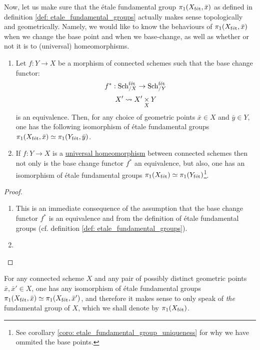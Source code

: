         Now, let us make sure that the \'etale fundamental group $\pi_1(X_{\mathrm{f\acute{e}t}}, \bar{x})$ as defined in definition \ref{def: etale_fundamental_groups} actually makes sense topologically and geometrically. Namely, we would like to know the behaviours of $\pi_1(X_{\mathrm{f\acute{e}t}}, \bar{x})$ when we change the base point and when we base-change, as well as whether or not it is  to (universal) homeomorphisms.
        \begin{proposition} \label{prop: the_etale_fundamental_group_as_a_topological_invariance}
            \noindent
            \begin{enumerate}
                \item Let $f: Y \to X$ be a morphism of connected schemes such that the base change functor:
                    $$f^*: \mathrm{Sch}_{/X}^{\mathrm{f\acute{e}t}} \to \mathrm{Sch}_{/Y}^{\mathrm{f\acute{e}t}}$$
                    $$X' \mapsto X' \x_X Y$$
                is an equivalence. Then, for any choice of geometric points $\bar{x} \in X$ and $\bar{y} \in Y$, one has the following isomorphism of \'etale fundamental groups $\pi_1(X_{\mathrm{f\acute{e}t}}, \bar{x}) \simeq \pi_1(Y_{\mathrm{f\acute{e}t}}, \bar{y})$.
                \item If $f: Y \to X$ is a \href{https://stacks.math.columbia.edu/tag/04DC}{\underline{universal homeomorphism}} between connected schemes then not only is the base change functor $f^*$ an equivalence, but also, one has an isomorphism of \'etale fundamental groups $\pi_1(X_{\mathrm{f\acute{e}t}}) \simeq \pi_1(Y_{\mathrm{f\acute{e}t}})$\footnote{See corollary \ref{coro: etale_fundamental_group_uniqueness} for why we have ommited the base points.}. 
            \end{enumerate}
        \end{proposition}
            \begin{proof}
                \noindent
                \begin{enumerate}
                    \item This is an immediate consequence of the assumption that the base change functor $f^*$ is an equivalence and from the definition of \'etale fundamental groups (cf. definition \ref{def: etale_fundamental_groups}).
                    \item 
                \end{enumerate}
            \end{proof}
        \begin{corollary} \label{coro: etale_fundamental_group_uniqueness}
            For any connected scheme $X$ and any pair of possibly distinct geometric points $\bar{x}, \bar{x}' \in X$, one has any isomorphism of \'etale fundamental groups $\pi_1(X_{\mathrm{f\acute{e}t}}, \bar{x}) \simeq \pi_1(X_{\mathrm{f\acute{e}t}}, \bar{x}')$, and therefore it makes sense to only speak of \textit{the} fundamental group of $X$, which we shall denote by $\pi_1(X_{\mathrm{f\acute{e}t}})$.
        \end{corollary}
    
